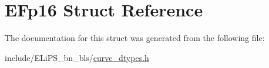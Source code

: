 \hypertarget{struct_e_fp16}{}\section{E\+Fp16 Struct Reference}
\label{struct_e_fp16}


The documentation for this struct was generated from the following file\+:\begin{DoxyCompactItemize}
\item 
include/\+E\+Li\+P\+S\+\_\+bn\+\_\+bls/\hyperlink{curve__dtypes_8h}{curve\+\_\+dtypes.\+h}\end{DoxyCompactItemize}
